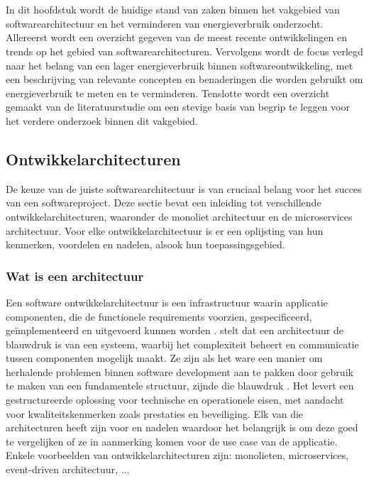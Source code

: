 \chapter{}%
\label{ch:stand-van-zaken}
In dit hoofdstuk wordt de huidige stand van zaken binnen het vakgebied van softwarearchitectuur en het verminderen van energieverbruik onderzocht. Allereerst wordt een overzicht gegeven van de meest recente ontwikkelingen en trends op het gebied van softwarearchitecturen. Vervolgens wordt de focus verlegd naar het belang van een lager energieverbruik binnen softwareontwikkeling, met een beschrijving van relevante concepten en benaderingen die worden gebruikt om energieverbruik te meten en te verminderen. Tenslotte wordt een overzicht gemaakt van de literatuurstudie om een stevige basis van begrip te leggen voor het verdere onderzoek binnen dit vakgebied.


\section{Ontwikkelarchitecturen}
De keuze van de juiste softwarearchitectuur is van cruciaal belang voor het succes van een softwareproject. Deze sectie bevat een inleiding tot verschillende ontwikkelarchitecturen, waaronder de monoliet architectuur en de microservices architectuur. Voor elke ontwikkelarchitectuur is er een oplijsting van hun kenmerken, voordelen en nadelen, alsook hun toepassingsgebied. 

\subsection{Wat is een architectuur}
Een software ontwikkelarchitectuur is een infrastructuur waarin applicatie componenten, die de functionele requirements voorzien, gespecificeerd, geïmplementeerd en uitgevoerd kunnen worden \autocite{Solms2012}. \textcite{Jaiswal2019} stelt dat een architectuur de blauwdruk is van een systeem, waarbij het complexiteit beheert en communicatie tussen componenten mogelijk maakt. Ze zijn als het ware een manier om herhalende problemen binnen software development aan te pakken door gebruik te maken van een fundamentele structuur, zijnde die blauwdruk \autocite{Dhaduk2020}.  Het levert een gestructureerde oplossing voor technische en operationele eisen, met aandacht voor kwaliteitskenmerken zoals prestaties en beveiliging. Elk van die architecturen heeft zijn voor en nadelen waardoor het belangrijk is om deze goed te vergelijken of ze in aanmerking komen voor de use case van de applicatie. Enkele voorbeelden van ontwikkelarchitecturen zijn: monolieten, microservices, event-driven architectuur, ...

